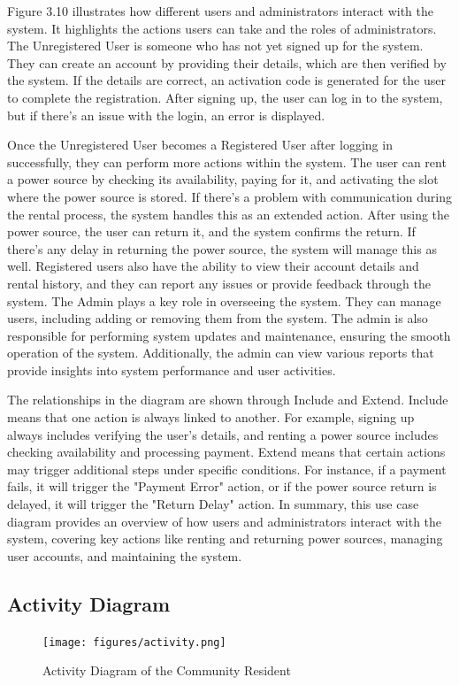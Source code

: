 {Figure 3.10 illustrates how different users and administrators interact with the system. It highlights the actions users can take and the roles of administrators. The Unregistered User is someone who has not yet signed up for the system. They can create an account by providing their details, which are then verified by the system. If the details are correct, an activation code is generated for the user to complete the registration. After signing up, the user can log in to the system, but if there’s an issue with the login, an error is displayed.
 
 Once the Unregistered User becomes a Registered User after logging in successfully, they can perform more actions within the system. The user can rent a power source by checking its availability, paying for it, and activating the slot where the power source is stored. If there’s a problem with communication during the rental process, the system handles this as an extended action. After using the power source, the user can return it, and the system confirms the return. If there’s any delay in returning the power source, the system will manage this as well. Registered users also have the ability to view their account details and rental history, and they can report any issues or provide feedback through the system. The Admin plays a key role in overseeing the system. They can manage users, including adding or removing them from the system. The admin is also responsible for performing system updates and maintenance, ensuring the smooth operation of the system. Additionally, the admin can view various reports that provide insights into system performance and user activities.
 
 The relationships in the diagram are shown through Include and Extend. Include means that one action is always linked to another. For example, signing up always includes verifying the user's details, and renting a power source includes checking availability and processing payment. Extend means that certain actions may trigger additional steps under specific conditions. For instance, if a payment fails, it will trigger the "Payment Error" action, or if the power source return is delayed, it will trigger the "Return Delay" action. In summary, this use case diagram provides an overview of how users and administrators interact with the system, covering key actions like renting and returning power sources, managing user accounts, and maintaining the system.
 
 \subsection{Activity Diagram}
  \begin{figure}[H]
 	\centering
 	\caption{Activity Diagram of the Community Resident}
 	\label{fig:activity}
 	\texttt{[image: figures/activity.png]}
 \end{figure}
 
}
